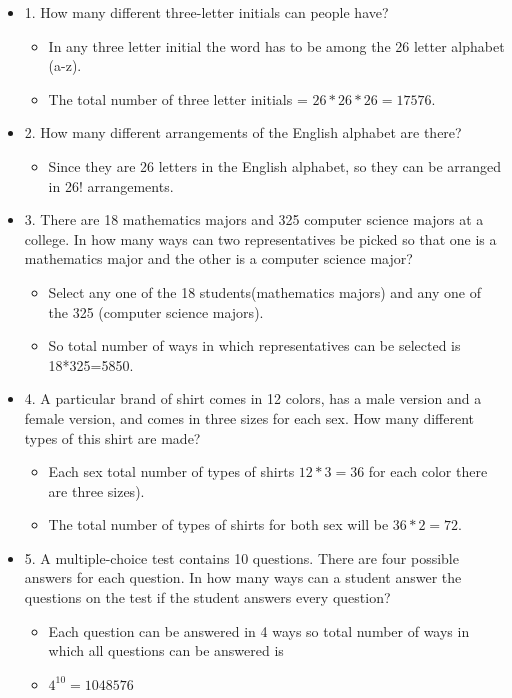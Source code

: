 \documentclass[11pt]{article}
\begin{document}
\begin{itemize}

\item 1. How many different three-letter initials can people have?
\begin{itemize}
\item In any three letter initial the word has to be among the 26 letter alphabet (a-z).
\item The total number of three letter  initials = $26 * 26 * 26 = 17576$.
\end{itemize} 

\item 2. How many different arrangements of the English alphabet are there?
\begin{itemize}
\item Since they are 26 letters in the English alphabet, so they can be arranged in 26! arrangements. 
\end{itemize} 


\item 3. There are 18 mathematics majors and 325 computer science majors at a college. In how many ways
can two representatives be picked so that one is a mathematics major and the other is a computer
science major?
\begin{itemize}
\item Select any one of the 18 students(mathematics majors) and any one of the 325 (computer science majors).
\item So total number of ways in which representatives can be selected is 18*325=5850.
\end{itemize}


\item 4. A particular brand of shirt comes in 12 colors, has a male version and a female version, and comes in
three sizes for each sex. How many different types of this shirt are made?
\begin{itemize}
\item Each sex total number of types of shirts $12*3=36$  for each color there are three sizes).
\item The total number of types of shirts for both sex will be $36*2=72$.
\end{itemize} 


\item 5. A multiple-choice test contains 10 questions. There are four possible answers for each question. In
how many ways can a student answer the questions on the test if the student answers every question?
\begin{itemize}
\item Each question can be answered in 4 ways so total number of ways in which all questions can be answered is
\item $4^{10}=1048576$
\end{itemize} 


\end{itemize}
\end{document}
